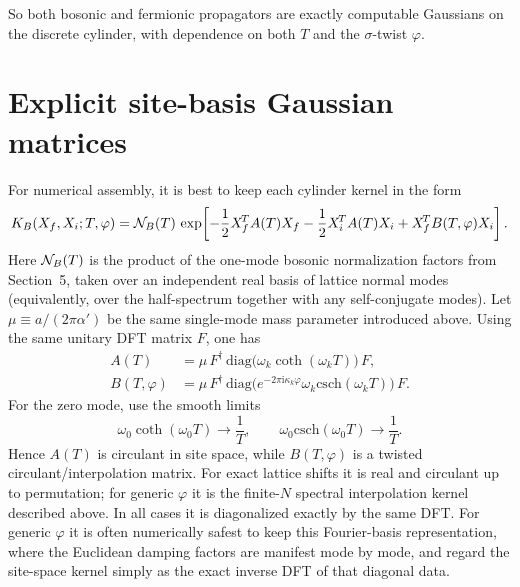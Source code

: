 \documentclass[11pt]{article}
\numberwithin{equation}{section}
\newcommand{\al}{\alpha'}
\newcommand{\ii}{\mathrm{i}}
\begin{document}
So both bosonic and fermionic propagators are exactly computable Gaussians on the discrete cylinder, with dependence on both $T$ and the $\sigma$-twist $\varphi$.

\section{Explicit site-basis Gaussian matrices}
For numerical assembly, it is best to keep each cylinder kernel in the form
\begin{equation}
\label{eq:s7-001}
K_B(X_f,X_i;T,\varphi)=
{\cal N}_B(T)\,
\exp\!\left[
-\frac12 X_f^{\!T}A(T)X_f
-\frac12 X_i^{\!T}A(T)X_i
+X_f^{\!T}B(T,\varphi)X_i
\right].
\end{equation}
Here ${\cal N}_B(T)$ is the product of the one-mode bosonic normalization factors from Section~5, taken over an independent real basis of lattice normal modes (equivalently, over the half-spectrum together with any self-conjugate modes). Let $\mu \equiv a/(2\pi\al)$ be the same single-mode mass parameter introduced above. Using the same unitary DFT matrix $F$, one has
\begin{align}
A(T)&=\mu\,F^\dagger\,
\mathrm{diag}\!\big(\omega_k\coth(\omega_k T)\big)\,F,
\label{eq:s7-A-matrix}\\
B(T,\varphi)&=\mu\,F^\dagger\,
\mathrm{diag}\!\big(e^{-2\pi \ii \kappa_k\varphi}\omega_k\mathrm{csch}(\omega_k T)\big)\,F.
\label{eq:s7-B-matrix}
\end{align}
For the zero mode, use the smooth limits
\begin{equation}
\label{eq:s7-002}
\omega_0\coth(\omega_0 T)\to \frac{1}{T},\qquad
\omega_0\mathrm{csch}(\omega_0 T)\to \frac{1}{T}.
\end{equation}
Hence $A(T)$ is circulant in site space, while $B(T,\varphi)$ is a twisted circulant/interpolation matrix. For exact lattice shifts it is real and circulant up to permutation; for generic $\varphi$ it is the finite-$N$ spectral interpolation kernel described above. In all cases it is diagonalized exactly by the same DFT.
For generic $\varphi$ it is often numerically safest to keep this Fourier-basis representation, where the Euclidean damping factors are manifest mode by mode, and regard the site-space kernel simply as the exact inverse DFT of that diagonal data.
\end{document}
